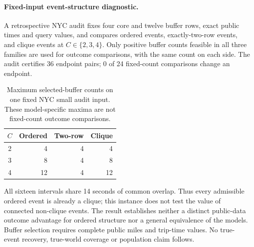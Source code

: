 \paragraph{Fixed-input event-structure diagnostic.}
A retrospective NYC audit fixes four core and twelve buffer rows,
exact public times and query values, and compares ordered events,
exactly-two-row events, and clique events at $C\in\{2,3,4\}$.
Only positive buffer counts feasible in all three families are used
for outcome comparisons, with the same count on each side.
The audit certifies 36 endpoint pairs;
0 of 24 fixed-count comparisons change an endpoint.
\begin{table}[t]
\centering
\begin{tabular}{c|rrr}
$C$ & Ordered & Two-row & Clique \\
\hline
2 & 4 & 4 & 4 \\
3 & 8 & 4 & 8 \\
4 & 12 & 4 & 12 \\
\end{tabular}
\caption{Maximum selected-buffer counts on one fixed NYC small audit input. These model-specific maxima are not fixed-count outcome comparisons.}
\label{tab:nyc-structure-diagnostic}
\end{table}
All sixteen intervals share 14 seconds of common overlap.
Thus every admissible ordered event is already a clique; this
instance does not test the value of connected non-clique events.
The result establishes neither a distinct public-data outcome
advantage for ordered structure nor a general equivalence of the models.
Buffer selection requires complete public miles and trip-time values.
No true-event recovery, true-world coverage or population claim follows.
